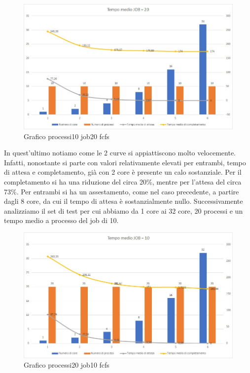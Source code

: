 \documentclass[Lau, oneside]{sapthesis}%
\begin{document}
\begin{figure}[ht!]
  \centering
  \includegraphics[width=1\textwidth]{Grafico processi10 job20 fcfs.jpg}
  \caption{Grafico processi10 job20 fcfs}
  \label{figura:p10j20fcfs}
\end{figure}
In quest'ultimo notiamo come le 2 curve si appiattiscono molto velocemente.
Infatti, nonostante si parte con valori relativamente elevati per entrambi, tempo di attesa e completamento, già con 2 core è presente un calo sostanziale.
Per il completamento si ha una riduzione del circa 20\%, mentre per l'attesa del circa 73\%.
Per entrambi si ha un assestamento, come nel caso precedente, a partire dagli 8 core, da cui il tempo di attesa è sostanzialmente nullo.
Successivamente analizziamo il set di test per cui abbiamo da 1 core ai 32 core, 20 processi e un tempo medio a processo del job di 10.
\begin{figure}[ht!]
  \centering
  \includegraphics[width=1\textwidth]{Grafico processi20 job10 fcfs.jpg}
  \caption{Grafico processi20 job10 fcfs}
  \label{figura:p20j10fcfs}
\end{figure}
\end{document}
